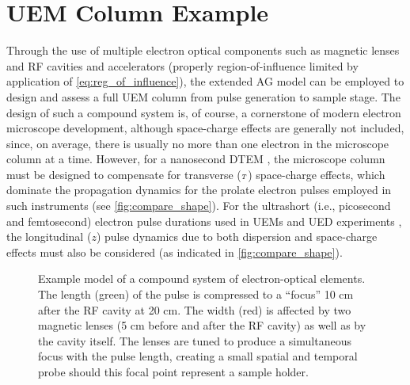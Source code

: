
\section{UEM Column Example} \label{sec:compound}

Through the use of multiple electron optical components such as magnetic lenses and RF cavities and accelerators (properly region-of-influence limited by application of \ref{eq:reg_of_influence}), the extended AG model can be employed to design and assess a full UEM column from pulse generation to sample stage.
The design of such a compound system is, of course, a cornerstone of modern electron microscope development, although space-charge effects are generally not included, since, on average, there is usually no more than one electron in the microscope column at a time.
However, for a nanosecond DTEM \cite{lagrange_nanosecond_2008,reed_evolution_2009}, the microscope column must be designed to compensate for transverse (${\scriptscriptstyle T}$) space-charge effects, which dominate the propagation dynamics for the prolate electron pulses employed in such instruments (see \ref{fig:compare_shape}).
For the ultrashort (i.e., picosecond and femtosecond) electron pulse durations used in UEMs\cite{park_direct_2009} and UED experiments \cite{oudheusden_electron_2007}, the longitudinal ($z$) pulse dynamics due to both dispersion and space-charge effects must also be considered (as indicated in \ref{fig:compare_shape}).

\begin{figure}
  \centering
  
  \caption[Example model of a compound system of electron-optical elements]{
    Example model of a compound system of electron-optical elements.
    The length (green) of the pulse is compressed to a ``focus'' 10 cm after the RF cavity at 20 cm.
    The width (red) is affected by two magnetic lenses (5 cm before and after the RF cavity) as well as by the cavity itself.
    The lenses are tuned to produce a simultaneous focus with the pulse length, creating a small spatial and temporal probe should this focal point represent a sample holder.
  }
  \label{fig:compound}
\end{figure}

